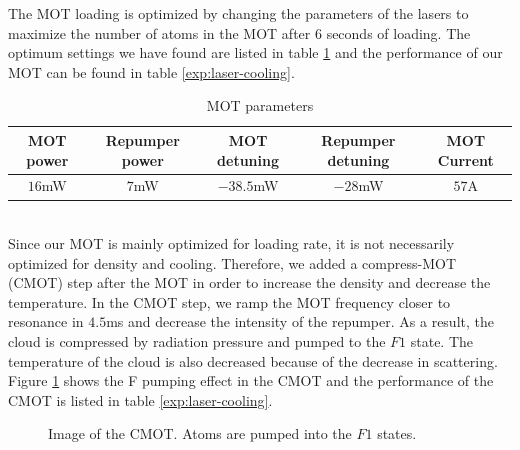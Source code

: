 The MOT loading is optimized by changing the parameters of the lasers to maximize the number of atoms in the MOT after $6$ seconds of loading. The optimum settings we have found are listed in table \ref{exp:mot-param} and the performance of our MOT can be found in table \ref{exp:laser-cooling}.\\
\begin{table}
  \begin{center}
    \begin{tabular}{|c|c|c|c|c|}\hline
      MOT power&Repumper power&MOT detuning&Repumper detuning&MOT Current\\\hline
      $16$mW&$7$mW&$-38.5$mW&$-28$mW&$57$A\\\hline
    \end{tabular}
  \end{center}
  \caption{MOT parameters}
  \label{exp:mot-param}
\end{table}\\
Since our MOT is mainly optimized for loading rate, it is not necessarily optimized for density and cooling. Therefore, we added a compress-MOT (CMOT) step after the MOT in order to increase the density and decrease the temperature. In the CMOT step, we ramp the MOT frequency closer to resonance in $4.5$ms and decrease the intensity of the repumper. As a result, the cloud is compressed by radiation pressure and pumped to the $F1$ state. The temperature of the cloud is also decreased because of the decrease in scattering. Figure \ref{exp:cmot-image} shows the F pumping effect in the CMOT and the performance of the CMOT is listed in table \ref{exp:laser-cooling}.
\begin{figure}
  \begin{center}
  \end{center}
  \caption{Image of the CMOT. Atoms are pumped into the $F1$ states.}
  \label{exp:cmot-image}
\end{figure}

